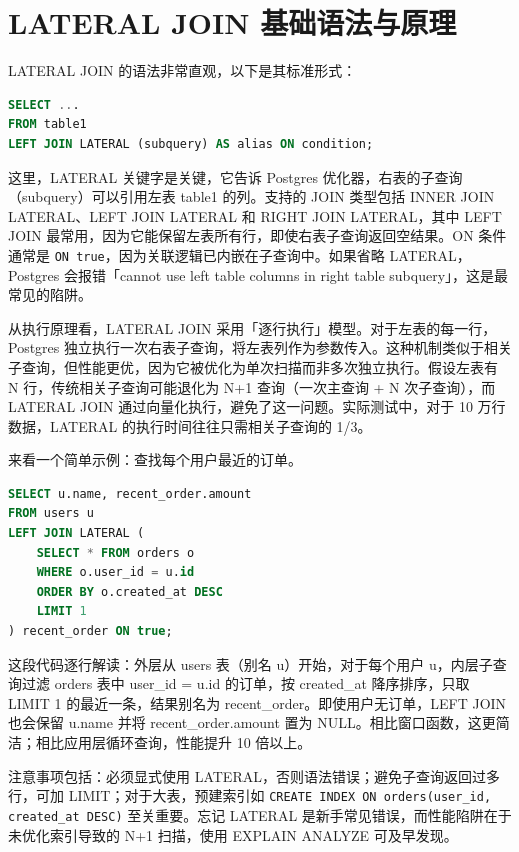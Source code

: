 \chapter{LATERAL JOIN 基础语法与原理}
LATERAL JOIN 的语法非常直观，以下是其标准形式：\par
\begin{lstlisting}[language=sql]
SELECT ...
FROM table1
LEFT JOIN LATERAL (subquery) AS alias ON condition;
\end{lstlisting}
这里，LATERAL 关键字是关键，它告诉 Postgres 优化器，右表的子查询（subquery）可以引用左表 table1 的列。支持的 JOIN 类型包括 INNER JOIN LATERAL、LEFT JOIN LATERAL 和 RIGHT JOIN LATERAL，其中 LEFT JOIN 最常用，因为它能保留左表所有行，即使右表子查询返回空结果。ON 条件通常是 \texttt{ON true}，因为关联逻辑已内嵌在子查询中。如果省略 LATERAL，Postgres 会报错「cannot use left table columns in right table subquery」，这是最常见的陷阱。\par
从执行原理看，LATERAL JOIN 采用「逐行执行」模型。对于左表的每一行，Postgres 独立执行一次右表子查询，将左表列作为参数传入。这种机制类似于相关子查询，但性能更优，因为它被优化为单次扫描而非多次独立执行。假设左表有 N 行，传统相关子查询可能退化为 N+1 查询（一次主查询 + N 次子查询），而 LATERAL JOIN 通过向量化执行，避免了这一问题。实际测试中，对于 10 万行数据，LATERAL 的执行时间往往只需相关子查询的 1/3。\par
来看一个简单示例：查找每个用户最近的订单。\par
\begin{lstlisting}[language=sql]
SELECT u.name, recent_order.amount
FROM users u
LEFT JOIN LATERAL (
    SELECT * FROM orders o 
    WHERE o.user_id = u.id 
    ORDER BY o.created_at DESC 
    LIMIT 1
) recent_order ON true;
\end{lstlisting}
这段代码逐行解读：外层从 users 表（别名 u）开始，对于每个用户 u，内层子查询过滤 orders 表中 user\_{}id = u.id 的订单，按 created\_{}at 降序排序，只取 LIMIT 1 的最近一条，结果别名为 recent\_{}order。即使用户无订单，LEFT JOIN 也会保留 u.name 并将 recent\_{}order.amount 置为 NULL。相比窗口函数，这更简洁；相比应用层循环查询，性能提升 10 倍以上。\par
注意事项包括：必须显式使用 LATERAL，否则语法错误；避免子查询返回过多行，可加 LIMIT；对于大表，预建索引如 \texttt{CREATE INDEX ON orders(user\_{}id, created\_{}at DESC)} 至关重要。忘记 LATERAL 是新手常见错误，而性能陷阱在于未优化索引导致的 N+1 扫描，使用 EXPLAIN ANALYZE 可及早发现。\par
